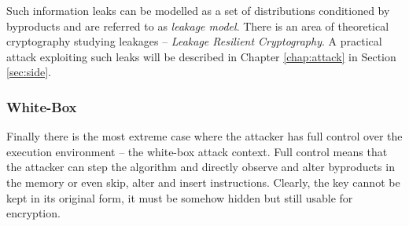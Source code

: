 Such information leaks can be modelled as a set of distributions conditioned by byproducts and are referred to as {\em leakage model}. There is an area of theoretical cryptography studying leakages -- {\em Leakage Resilient Cryptography}. A practical attack exploiting such leaks will be described in Chapter \ref{chap:attack} in Section \ref{sec:side}.   %

\subsubsection{White-Box}

Finally there is the most extreme case where the attacker has full control over the execution environment -- the white-box attack context. Full control means that the attacker can step the algorithm and directly observe and alter byproducts in the memory or even skip, alter and insert instructions. Clearly, the key cannot be kept in its original form, it must be somehow hidden but still usable for encryption.
